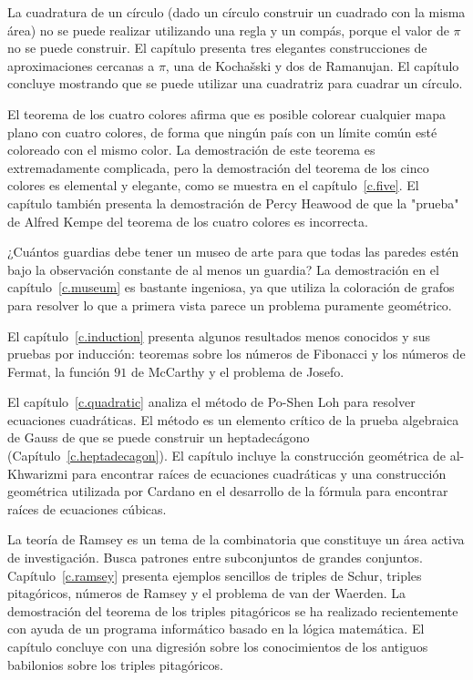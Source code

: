 La cuadratura de un círculo (dado un círculo construir un cuadrado con la misma área) no se puede realizar utilizando una regla y un compás, porque el valor de $\pi$ no se puede construir. El capítulo presenta tres elegantes construcciones de aproximaciones cercanas a $\pi$, una de Kochašski y dos de Ramanujan. El capítulo concluye mostrando que se puede utilizar una cuadratriz para cuadrar un círculo.

El teorema de los cuatro colores afirma que es posible colorear cualquier mapa plano con cuatro colores, de forma que ningún país con un límite común esté coloreado con el mismo color. La demostración de este teorema es extremadamente complicada, pero la demostración del teorema de los cinco colores es elemental y elegante, como se muestra en el capítulo~\ref{c.five}. El capítulo también presenta la demostración de Percy Heawood de que la "prueba" de Alfred Kempe del teorema de los cuatro colores es incorrecta.

¿Cuántos guardias debe tener un museo de arte para que todas las paredes estén bajo la observación constante de al menos un guardia? La demostración en el capítulo~\ref{c.museum} es bastante ingeniosa, ya que utiliza la coloración de grafos para resolver lo que a primera vista parece un problema puramente geométrico.

El capítulo~\ref{c.induction} presenta algunos resultados menos conocidos y sus pruebas por inducción: teoremas sobre los números de Fibonacci y los números de Fermat, la función $91$ de McCarthy y el problema de Josefo.

El capítulo~\ref{c.quadratic} analiza el método de Po-Shen Loh para resolver ecuaciones cuadráticas. El método es un elemento crítico de la prueba algebraica de Gauss de que se puede construir un heptadecágono (Capítulo~\ref{c.heptadecagon}). El capítulo incluye la construcción geométrica de al-Khwarizmi para encontrar raíces de ecuaciones cuadráticas y una construcción geométrica utilizada por Cardano en el desarrollo de la fórmula para encontrar raíces de ecuaciones cúbicas.

La teoría de Ramsey es un tema de la combinatoria que constituye un área activa de investigación. Busca patrones entre subconjuntos de grandes conjuntos. Capítulo~\ref{c.ramsey} presenta ejemplos sencillos de triples de Schur, triples pitagóricos, números de Ramsey y el problema de van der Waerden. La demostración del teorema de los triples pitagóricos se ha realizado recientemente con ayuda de un programa informático basado en la lógica matemática. El capítulo concluye con una digresión sobre los conocimientos de los antiguos babilonios sobre los triples pitagóricos.

